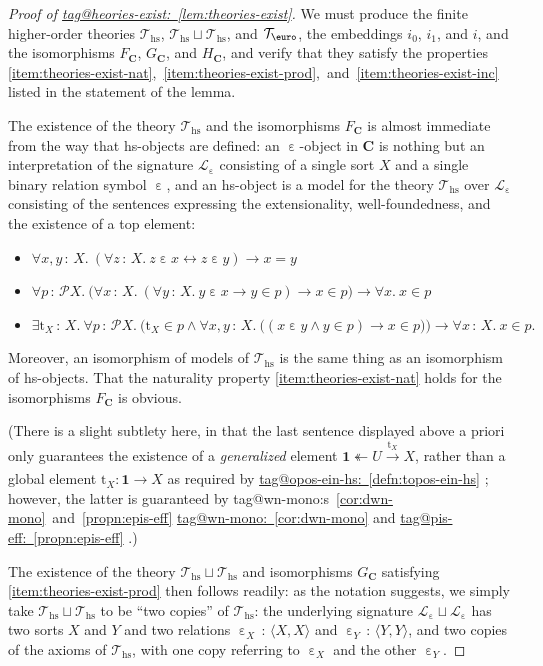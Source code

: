 \documentclass{amsart}
\makeatletter
\newcommand\bC{\mathbf{C}}
\newcommand\br[1]{\langle{}#1\rangle{}}
\newcommand\cL{\mathcal{L}}
\newcommand\cT{\mathcal{T}}
\newcommand\Ein{\mathrel{\text{\textup{\euro}}}}
\newcommand\ein{\mathrel{\varepsilon}}
\newcommand\hs{\mathrm{hs}}
\newcommand\oot{\twoheadleftarrow}
\newcommand\pbig[1]{\big({#1}\big)}
\newcommand\pBig[1]{\Big({#1}\Big)}
\newcommand\pow{\mathcal{P}}
\newcommand\rt{\mathrm{t}}
\newcommand\tm{\mathbf{1}}
\newcommand\tolon{{\,:\,}}
\newcommand\tot{\leftrightarrow}
\newcommand\tox[2][]{\xrightarrow[#1]{#2}}
\newcommand\unein{{\ein}}
\newcommand\unEin{{\Ein}}
\newcommand\tagword[1]{\csname tag@#1\endcsname}
\def\label@tag#1:#2\@nil{#1}
\newcommand\labeltag[1]{\label@tag#1:\@nil}
\newcommand\jref[1]{%
  \texorpdfstring%
    {\hyperref[#1]{\tagword{\labeltag{#1}}~\ref*{#1}}}%
    {\tagword{\labeltag{#1}}~\ref*{#1}}%
}
\newcommand\jrefs[2]{%
  \ifthenelse{\equal{\labeltag{#1}}{\labeltag{#2}}}%
  {%
    \texorpdfstring%
      {\tagword{\labeltag{#1}}s~\ref{#1}~and~\ref{#2}}%
      {\tagword{\labeltag{#1}}s~\ref*{#1}~and~\ref*{#2}}%
  }{\jref{#1} and \jref{#2}}%
}
\theoremstyle{definition}
\theoremstyle{remark}
\theoremstyle{plainwithref}
\makeatother
\begin{document}
\begin{proof}[Proof of \jref{lem:theories-exist}] \label{proof:theories-exist}
  We must produce the finite higher-order theories \( \cT_\hs \), \( \cT_{\hs} \sqcup \cT_{\hs} \), and \( \cT_{\unEin} \), the embeddings \( i_0 \), \( i_1 \), and \( i \), and the isomorphisms \( F_\bC \), \( G_\bC \), and \( H_\bC \), and verify that they satisfy the properties \ref{item:theories-exist-nat},~\ref{item:theories-exist-prod},~and~\ref{item:theories-exist-inc} listed in the statement of the lemma.

  The existence of the theory \( \cT_{\hs} \) and the isomorphisms \( F_\bC \) is almost immediate from the way that hs-objects are defined: an \( \unein \)-object in \( \bC \) is nothing but an interpretation of the signature \( \cL_\unein \) consisting of a single sort \( X \) and a single binary relation symbol \( \unein \), and an hs-object is a model for the theory \( \cT_\hs \) over \( \cL_\unein \) consisting of the sentences expressing the extensionality, well-foundedness, and the existence of a top element:
  \begin{itemize}
  \item \( \forall x,y \tolon X.\ (\forall z \tolon X.\ z \ein x \tot z \ein y) \to x = y \)
  \item \( \forall p \tolon \pow X.\ \pbig{\forall x \tolon X.\ (\forall y \tolon X.\ y \ein x \to y \in p) \to x \in p} \to \forall x.\ x \in p \)
  \item \(
    \exists \rt_X \tolon X.\
    \forall p \tolon \pow X.\
    \pBig{\rt_X \in p \wedge \forall x,y \tolon X.\ \pbig{(x \ein y \wedge y \in p) \to x \in p}}
    \to \forall x \tolon X.\ x \in p.
    \)
  \end{itemize}
  Moreover, an isomorphism of models of \( \cT_\hs \) is the same thing as an isomorphism of hs-objects.
  That the naturality property \ref{item:theories-exist-nat} holds for the isomorphisms \( F_\bC \) is obvious.

  (There is a slight subtlety here, in that the last sentence displayed above a priori only guarantees the existence of a \emph{generalized} element \( \tm \oot U \tox{\rt_X} X \), rather than a global element \( \rt_X \colon \tm \to X \) as required by \jref{defn:topos-ein-hs}; however, the latter is guaranteed by \jrefs{cor:dwn-mono}{propn:epis-eff}.)

  The existence of the theory \( \cT_{\hs} \sqcup \cT_{\hs} \) and isomorphisms \( G_\bC \) satisfying \ref{item:theories-exist-prod} then follows readily: as the notation suggests, we simply take \( \cT_{\hs} \sqcup \cT_{\hs} \) to be ``two copies'' of \( \cT_\hs \): the underlying signature \( \cL_\unein \sqcup \cL_\unein \) has two sorts \( X \) and \( Y \) and two relations \( \unein_X \tolon \br{X,X} \) and \( \unein_Y \tolon \br{Y,Y} \), and two copies of the axioms of \( \cT_\hs \), with one copy referring to \( \unein_X \) and the other \( \unein_Y \).


\end{proof}
\end{document}
